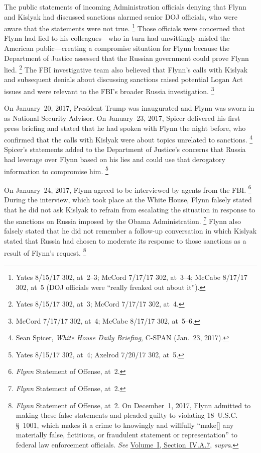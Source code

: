 The public statements of incoming Administration officials denying that Flynn and Kislyak had discussed sanctions alarmed senior DOJ officials, who were aware that the statements were not true.%
\footnote{Yates 8/15/17 302, at~2--3;
McCord 7/17/17 302, at~3--4;
McCabe 8/17/17 302, at~5 (DOJ officials were ``really freaked out about it'').}
Those officials were concerned that Flynn had lied to his colleagues---who in turn had unwittingly misled the American public---creating a compromise situation for Flynn because the Department of Justice assessed that the Russian government could prove Flynn lied.%
\footnote{Yates 8/15/17 302, at~3;
McCord 7/17/17 302, at~4.}
The FBI investigative team also believed that Flynn's calls with Kislyak and subsequent denials about discussing sanctions raised potential Logan Act issues and were relevant to the FBI's broader Russia investigation.%
\footnote{McCord 7/17/17 302, at~4;
McCabe 8/17/17 302, at~5--6.}

On January~20, 2017, President Trump was inaugurated and Flynn was sworn in as National Security Advisor.
On January~23, 2017, Spicer delivered his first press briefing and stated that he had spoken with Flynn the night before, who confirmed that the calls with Kislyak were about topics unrelated to sanctions.%
\footnote{Sean Spicer, \textit{White House Daily Briefing}, C-SPAN (Jan.~23, 2017).}
Spicer's statements added to the Department of Justice's concerns that Russia had leverage over Flynn based on his lies and could use that derogatory information to compromise him.%
\footnote{Yates 8/15/17 302, at~4;
Axelrod 7/20/17 302, at~5.}

On January~24, 2017, Flynn agreed to be interviewed by agents from the FBI\null.%
\footnote{\textit{Flynn} Statement of Offense, at~2.}
During the interview, which took place at the White House, Flynn falsely stated that he did not ask Kislyak to refrain from escalating the situation in response to the sanctions on Russia imposed by the Obama Administration.%
\footnote{\textit{Flynn} Statement of Offense, at~2.}
Flynn also falsely stated that he did not remember a follow-up conversation in which Kislyak stated that Russia had chosen to moderate its response to those sanctions as a result of Flynn's request.%
\footnote{\textit{Flynn} Statement of Offense, at~2.
On December~1, 2017, Flynn admitted to making these false statements and pleaded guilty to violating 18~U.S.C. \S~1001, which makes it a crime to knowingly and willfully ``make[] any materially false, fictitious, or fraudulent statement or representation'' to federal law enforcement officials.
\textit{See} \hyperlink{subsubsection.1.4.1.7}{Volume~I, Section~IV.A.7}, \textit{supra}.}

